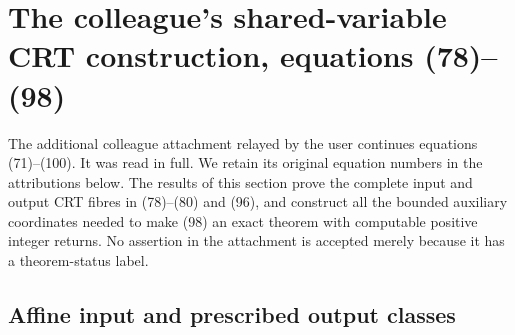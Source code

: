 \section{The colleague's shared-variable CRT construction, equations (78)--(98)}
\label{sec:shared-variable-crt}

The additional colleague attachment relayed by the user continues
equations (71)--(100).  It was read in full.  We retain its original
equation numbers in the attributions below.  The results of this
section prove the complete input and output CRT fibres in
(78)--(80) and (96), and construct all the bounded auxiliary
coordinates needed to make (98) an exact theorem with computable
positive integer returns.  No assertion in the attachment is
accepted merely because it has a theorem-status label.

\subsection{Affine input and prescribed output classes}

